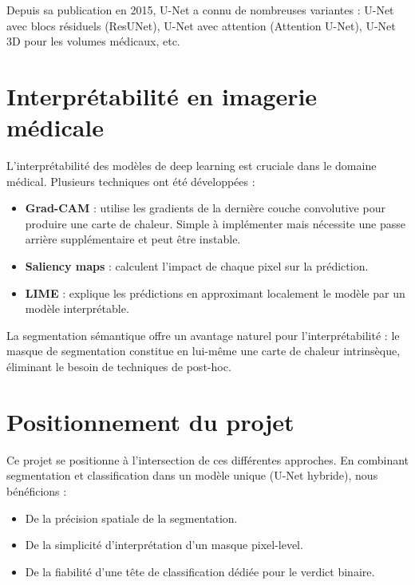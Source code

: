\documentclass[12pt,a4paper,twoside]{report}
\begin{document}
Depuis sa publication en 2015, U-Net a connu de nombreuses variantes : U-Net avec blocs résiduels (ResUNet), U-Net avec attention (Attention U-Net), U-Net 3D pour les volumes médicaux, etc.

\section{Interprétabilité en imagerie médicale}

L'interprétabilité des modèles de deep learning est cruciale dans le domaine médical. Plusieurs techniques ont été développées :

\begin{itemize}
  \item \textbf{Grad-CAM} \cite{gradcam} : utilise les gradients de la dernière couche convolutive pour produire une carte de chaleur. Simple à implémenter mais nécessite une passe arrière supplémentaire et peut être instable.
  \item \textbf{Saliency maps} : calculent l'impact de chaque pixel sur la prédiction.
  \item \textbf{LIME} : explique les prédictions en approximant localement le modèle par un modèle interprétable.
\end{itemize}

La segmentation sémantique offre un avantage naturel pour l'interprétabilité : le masque de segmentation constitue en lui-même une carte de chaleur intrinsèque, éliminant le besoin de techniques de post-hoc.

\section{Positionnement du projet}

Ce projet se positionne à l'intersection de ces différentes approches. En combinant segmentation et classification dans un modèle unique (U-Net hybride), nous bénéficions :
\begin{itemize}
  \item De la précision spatiale de la segmentation.
  \item De la simplicité d'interprétation d'un masque pixel-level.
  \item De la fiabilité d'une tête de classification dédiée pour le verdict binaire.
\end{itemize}

\end{document}
